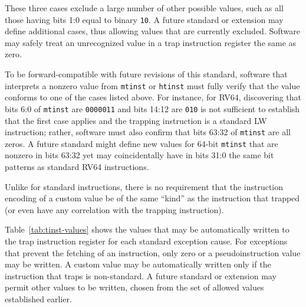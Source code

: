These three cases exclude a large number of other possible values, such
as all those having bits 1:0 equal to binary {\tt 10}.
A future standard or extension may define additional cases, thus allowing
values that are currently excluded.
Software may safely treat an unrecognized value in a trap instruction
register the same as zero.

\begin{commentary}
To be forward-compatible with future revisions of this standard, software
that interprets a nonzero value from {\tt mtinst} or {\tt htinst} must
fully verify that the value conforms to one of the cases listed above.
For instance, for RV64, discovering that bits 6:0 of {\tt mtinst} are
{\tt 0000011} and bits 14:12 are {\tt 010} is not sufficient to establish
that the first case applies and the trapping instruction is a standard LW
instruction;
rather, software must also confirm that bits 63:32 of {\tt mtinst} are
all zeros.
A future standard might define new values for 64-bit {\tt mtinst} that
are nonzero in bits 63:32 yet may coincidentally have in bits 31:0 the
same bit patterns as standard RV64 instructions.
\end{commentary}

\begin{commentary}
Unlike for standard instructions, there is no requirement that the
instruction encoding of a custom value be of the same ``kind'' as the
instruction that trapped (or even have any correlation with the trapping
instruction).
\end{commentary}

Table~\ref{tab:tinst-values} shows the values that may be automatically
written to the trap instruction register for each standard exception
cause.
For exceptions that prevent the fetching of an instruction, only zero or
a pseudoinstruction value may be written.
A custom value may be automatically written only if the instruction that
traps is non-standard.
A future standard or extension may permit other values to be written,
chosen from the set of allowed values established earlier.

